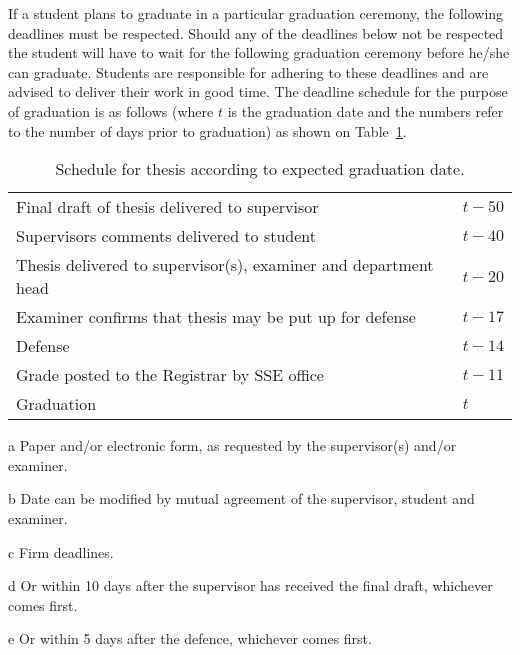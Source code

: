 If a student plans to graduate in a particular graduation ceremony, the following deadlines must be respected.
Should any of the deadlines below not be respected the student will have to wait for the following graduation ceremony before he/she can graduate.
Students are responsible for adhering to these deadlines and are advised to deliver their work in good time.
The deadline schedule for the purpose of graduation is as follows (where $t$ is the graduation date and the
numbers refer to the number of days prior to graduation) as shown on Table~\ref{tab:deadlines}.
\begin{table}
  \centering
  \begin{threeparttable}
\begin{tabular}{ll}
 Final draft of thesis delivered to supervisor\tnote{a} &$t-50$\tnote{b}\\
 Supervisors comments delivered to student &$t-40$\tnote{c,d}\\
 Thesis delivered to supervisor(s), examiner and department head\tnote{a} &$t-20$\tnote{c}\\
 Examiner confirms that thesis may be put up for defense &$t-17$\tnote{c}\\
 Defense &$t-14$\tnote{c}\\
 Grade posted to the Registrar by SSE office &$t-11$\tnote{c}\\
 Graduation &$t$\tnote{c}\\
\end{tabular}
\begin{tablenotes}
\item[a] Paper and/or electronic form, as requested by the supervisor(s) and/or examiner.
\item[b] Date can be modified by mutual agreement of the supervisor, student and examiner.
\item[c] Firm deadlines.
\item[d] Or within 10 days after the supervisor has received the final draft, whichever comes first.
\item[e] Or within 5 days after the defence, whichever comes first.
\end{tablenotes}
\caption{Schedule for thesis according to expected graduation date.}\label{tab:deadlines}
\end{threeparttable}
\end{table}

